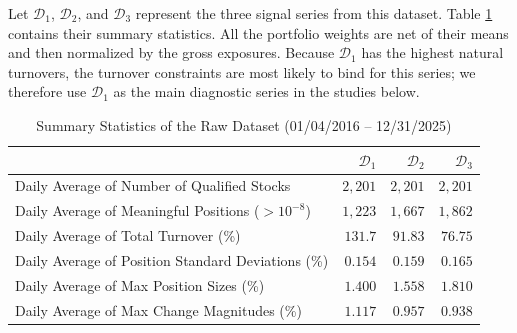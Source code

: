 \documentclass[11pt, letterpaper]{article}
\begin{document}
Let $\mathcal{D}_1$, $\mathcal{D}_2$, and $\mathcal{D}_3$ represent the three signal series from this dataset. Table
\ref{tab:summary} contains their summary statistics. All the portfolio weights are net of their means and then normalized by the
gross exposures. Because $\mathcal{D}_1$ has the highest natural turnovers, the turnover constraints are most likely to bind for
this series; we therefore use $\mathcal{D}_1$ as the main diagnostic series in the studies below.
\begin{table}
	\centering
  \caption{Summary Statistics of the Raw Dataset (01/04/2016 -- 12/31/2025)}\label{tab:summary}
  \begin{tabular}{lrrr}
    \toprule
    & $\mathcal{D}_1$ & $\mathcal{D}_2$ & $\mathcal{D}_3$ \\
    \midrule
    Daily Average of Number of Qualified Stocks & $2{,}201$ & $2{,}201$ & $2{,}201$ \\
    Daily Average of Meaningful Positions ($> 10^{-8}$) & $1,223$ & $1,667$ & $1,862$ \\
    Daily Average of Total Turnover (\%) & $131.7$ & $91.83$ & $76.75$ \\
    Daily Average of Position Standard Deviations (\%) & $0.154$ & $0.159$ & $0.165$\\
    Daily Average of Max Position Sizes (\%) & $1.400$ & $1.558$ & $1.810$\\
    Daily Average of Max Change Magnitudes (\%) & $1.117$ & $0.957$ & $0.938$ \\
    \bottomrule
  \end{tabular}
\end{table}
\end{document}
